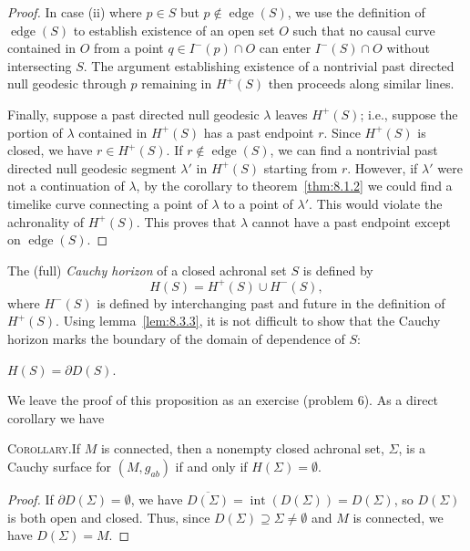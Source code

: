 \begin{proof}
In case (ii) where \(p\in S\) but \(p\notin\operatorname{edge}(S)\), we use the
definition of \(\operatorname{edge}(S)\) to establish existence of an open set \(O\)
such that no causal curve contained in \(O\) from a point
\(q\in I^-(p)\cap O\) can enter \(I^-(S)\cap O\) without intersecting \(S\). The
argument establishing existence of a nontrivial past directed null geodesic through
\(p\) remaining in \(H^+(S)\) then proceeds along similar lines.

Finally, suppose a past directed null geodesic \(\lambda\) leaves \(H^+(S)\); i.e.,
suppose the portion of \(\lambda\) contained in \(H^+(S)\) has a past endpoint \(r\).
Since \(H^+(S)\) is closed, we have \(r\in H^+(S)\). If
\(r\notin\operatorname{edge}(S)\), we can find a nontrivial past directed null
geodesic segment \(\lambda'\) in \(H^+(S)\) starting from \(r\). However, if
\(\lambda'\) were not a continuation of \(\lambda\), by the corollary to
theorem~\ref{thm:8.1.2} we could find a timelike curve connecting a point of
\(\lambda\) to a point of \(\lambda'\). This would violate the achronality of
\(H^+(S)\). This proves that \(\lambda\) cannot have a past endpoint except on
\(\operatorname{edge}(S)\).
\end{proof}

The (full) \emph{Cauchy horizon} of a closed achronal set \(S\) is defined by
\begin{equation}
  H(S)=H^+(S)\cup H^-(S),
  \tag{8.3.5}\label{eq:8.3.5}
\end{equation}
where \(H^-(S)\) is defined by interchanging past and future in the definition of
\(H^+(S)\). Using lemma~\ref{lem:8.3.3}, it is not difficult to show that the Cauchy
horizon marks the boundary of the domain of dependence of \(S\):

\begin{proposition}\label{prop:8.3.6}
\(H(S)=\partial D(S)\).
\end{proposition}

We leave the proof of this proposition as an exercise (problem 6). As a direct
corollary we have

\medskip
\noindent\textsc{Corollary.}\quad If \(M\) is connected, then a nonempty closed
achronal set, \(\Sigma\), is a Cauchy surface for \((M,g_{ab})\) if and only if
\(H(\Sigma)=\emptyset\).
\medskip
\begin{proof}
If \(\partial D(\Sigma)=\emptyset\), we have
\(\overline{D(\Sigma)}=\operatorname{int}(D(\Sigma))=D(\Sigma)\), so \(D(\Sigma)\)
is both open and closed. Thus, since \(D(\Sigma)\supseteq\Sigma\ne\emptyset\) and
\(M\) is connected, we have \(D(\Sigma)=M\).
\end{proof}

